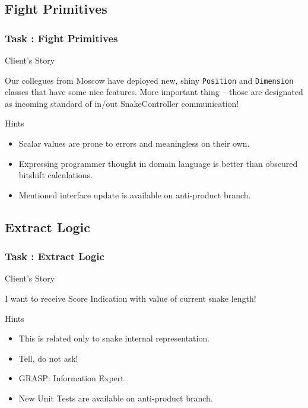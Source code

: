 \documentclass[english]{beamer}
\newenvironment{narrowblock}[1]{%
\begin{center}
\begin{minipage}{10.5cm}
\begin{block}{#1}
}{%
\end{block}
\end{minipage}
\end{center}
}
\begin{document}
\subsection{Fight Primitives}

\begin{frame}
\frametitle{Task \thesubsection: Fight Primitives}

\begin{narrowblock}{Client's Story}
Our collegues from Moscow have deployed new, shiny \texttt{Position} and \texttt{Dimension} classes that have some nice features. More important thing -- those are designated as incoming standard of in/out SnakeController communication!
\end{narrowblock}

\pause
\begin{narrowblock}{Hints}
\begin{itemize}[<+->]
\item Scalar values are prone to errors and meaningless on their own. 
\item Expressing programmer thought in domain language is better than obscured bitshift calculations.
\item Mentioned interface update is available on anti-product branch.
\end{itemize}
\end{narrowblock}
\end{frame}

\subsection{Extract Logic}

\begin{frame}
\frametitle{Task \thesubsection: Extract Logic}

\begin{narrowblock}{Client's Story}
I want to receive Score Indication with value of current snake length!
\end{narrowblock}

\pause
\begin{narrowblock}{Hints}
\begin{itemize}[<+->]
\item This is related only to snake internal representation.
\item Tell, do not ask!
\item GRASP: Information Expert.
\item New Unit Tests are available on anti-product branch.
\end{itemize}
\end{narrowblock}
\end{frame}
\end{document}
